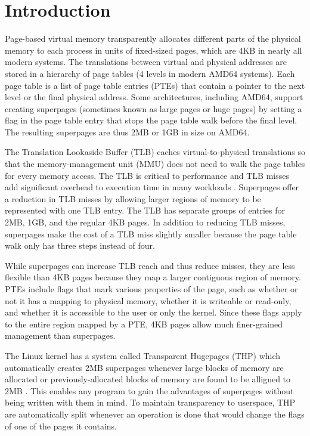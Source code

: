 \chapter{Introduction}

Page-based virtual memory transparently allocates different parts of the physical memory to each process in units of fixed-sized pages, which are 4KB in nearly all modern systems. The translations between virtual and physical addresses are stored in a hierarchy of page tables (4 levels in modern AMD64 systems). Each page table is a list of page table entries (PTEs) that contain a pointer to the next level or the final physical address. Some architectures, including AMD64, support creating superpages (sometimes known as large pages or huge pages) by setting a flag in the page table entry that stops the page table walk before the final level. The resulting superpages are thus 2MB or 1GB in size on AMD64.

The Translation Lookaside Buffer (TLB) caches virtual-to-physical translations so that the memory-management unit (MMU) does not need to walk the page tables for every memory access. The TLB is critical to performance and TLB misses add significant overhead to execution time in many workloads \cite{Barr}. Superpages offer a reduction in TLB misses by allowing larger regions of memory to be represented with one TLB entry. The TLB has separate groups of entries for 2MB, 1GB, and the regular 4KB pages. In addition to reducing TLB misses, superpages make the cost of a TLB miss slightly smaller because the page table walk only has three steps instead of four.

While superpages can increase TLB reach and thus reduce misses, they are less flexible than 4KB pages because they map a larger contiguous region of memory. PTEs include flags that mark various properties of the page, such as whether or not it has a mapping to physical memory, whether it is writeable or read-only, and whether it is accessible to the user or only the kernel. Since these flags apply to the entire region mapped by a PTE, 4KB pages allow much finer-grained management than superpages.

The Linux kernel has a system called Transparent Hugepages (THP) which automatically creates 2MB superpages whenever large blocks of memory are allocated or previously-allocated blocks of memory are found to be alligned to 2MB \cite{THP}. This enables any program to gain the advantages of superpages without being written with them in mind. To maintain transparency to userspace, THP are automatically split whenever an operation is done that would change the flags of one of the pages it contains.

